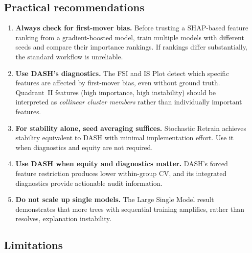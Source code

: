 \documentclass[11pt]{article}
\newcommand{\dash}{\textsc{DASH}}
\begin{document}
\subsection{Practical recommendations}

\begin{enumerate}
  \item \textbf{Always check for first-mover bias.} Before trusting a
    SHAP-based feature ranking from a gradient-boosted model, train
    multiple models with different seeds and compare their importance
    rankings. If rankings differ substantially, the standard workflow
    is unreliable.
  \item \textbf{Use \dash{}'s diagnostics.} The FSI and IS Plot detect
    which specific features are affected by first-mover bias, even
    without ground truth. Quadrant~II features (high importance, high
    instability) should be interpreted as \emph{collinear cluster
    members} rather than individually important features.
  \item \textbf{For stability alone, seed averaging suffices.}
    Stochastic Retrain achieves stability equivalent to \dash{} with
    minimal implementation effort. Use it when diagnostics and equity
    are not required.
  \item \textbf{Use \dash{} when equity and diagnostics matter.}
    \dash{}'s forced feature restriction produces lower within-group
    CV, and its integrated diagnostics provide actionable audit
    information.
  \item \textbf{Do not scale up single models.} The Large Single Model
    result demonstrates that more trees with sequential training
    amplifies, rather than resolves, explanation instability.
\end{enumerate}

\subsection{Limitations}
\end{document}
